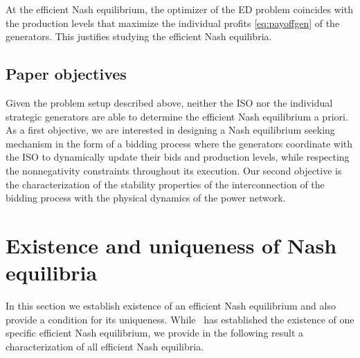 \documentclass[journal]{IEEEtran}
\newcommand{\1}{\mathds 1}
\theoremstyle{remark}
\theoremstyle{definition}
\newcommand{\marginac}[1]{\marginpar{\color{magenta}\tiny\ttfamily#1}}
\begin{document}
At the efficient Nash equilibrium, the optimizer of the ED problem
coincides with the production levels that maximize the individual
profits \eqref{eq:payoffgen} of the generators. This justifies
studying the efficient Nash equilibria.

\subsection{Paper objectives}
Given the problem setup described above, neither the ISO nor the
individual strategic generators are able to determine the efficient
Nash equilibrium a priori.  As a first objective, we are interested in
designing a Nash equilibrium seeking mechanism in the form of a
bidding process where the generators coordinate with the ISO to
dynamically update their bids and production levels, while respecting
the nonnegativity constraints throughout its execution.  Our second
objective is the characterization of the stability properties of the
interconnection of the bidding process
with the physical dynamics of the power network.


\section{Existence and uniqueness of Nash
  equilibria}\label{sec:exist-uniq-nash}
%

In this section we establish existence of an efficient Nash
equilibrium and also provide a condition for its uniqueness.
While~\cite{cherukuri2016decentralized} has established the existence
of one specific efficient Nash equilibrium, we provide in the
following result a characterization of all efficient Nash
equilibria.
\end{document}
